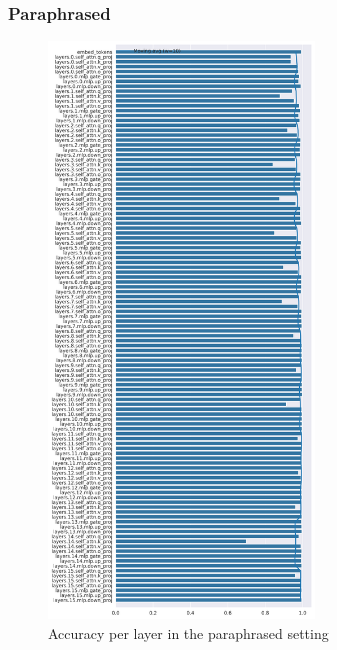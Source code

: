 \subsubsection{Paraphrased}
\begin{figure}[ht]
    \centering
    \includegraphics[width=0.63\textwidth]{figures/results/paraphrased/accuracy_per_layer.png}
    \caption{Accuracy per layer in the paraphrased setting}
    \label{fig:paraphrased_accuracy_per_layer}
\end{figure}

